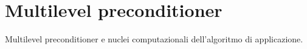 \section{Multilevel preconditioner}
%
Multilevel preconditioner e nuclei computazionali dell’algoritmo di applicazione.
